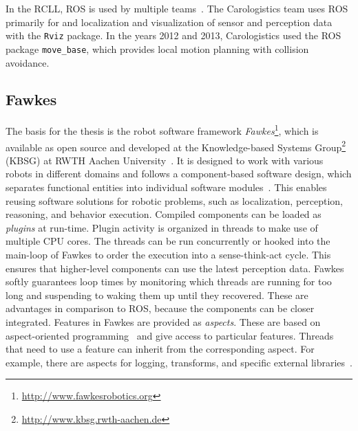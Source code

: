 In the RCLL, ROS is used by multiple teams~\cite{rc-2014}. The
Carologistics team uses ROS primarily for and localization and
visualization of sensor and perception data with the \texttt{Rviz}
package. In the years 2012 and 2013, Carologistics used the ROS package
\texttt{move\_base}, which provides local motion planning with
collision avoidance.

\subsection{Fawkes}
\label{sec:fawkes}
The basis for the thesis is the robot software framework
\emph{Fawkes}\footnote{\url{http://www.fawkesrobotics.org}}, which is
available as open source and developed at the Knowledge-based Systems
Group\footnote{\url{http://www.kbsg.rwth-aachen.de}} (KBSG) at RWTH
Aachen University~\cite{FawkesDesign,Fawkes-RCLL-2014}.  It is
designed to work with various robots in different domains and follows
a component-based software design, which separates functional entities
into individual software modules~\cite{component}. This enables
reusing software solutions for robotic problems, such as localization,
perception, reasoning, and behavior execution. Compiled components can
be loaded as \emph{plugins} at run-time.
%
Plugin activity is organized in threads to make use of multiple CPU
cores. The threads can be run concurrently or hooked into the
main-loop of Fawkes to order the execution into a
sense-think-act cycle.  This ensures that higher-level
components can use the latest perception data.  Fawkes softly
guarantees loop times by monitoring which threads are running for too
long and suspending to waking them up until they recovered. These are advantages in comparison to ROS,
because the components can be closer integrated. Features in Fawkes
are provided as \emph{aspects}. These are based on aspect-oriented
programming~\cite{aspect_oriented} and give access to particular
features. Threads that need to use a feature can inherit from the
corresponding aspect. For example, there are aspects for logging,
transforms, and specific external libraries~\cite{tnthesis}.

